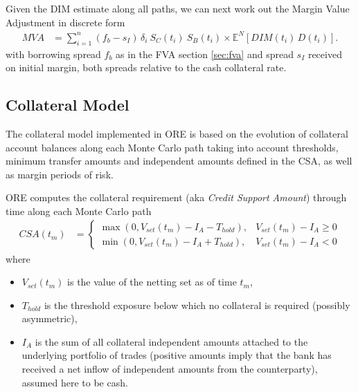 \documentclass[12pt, a4paper]{article}
\newcommand\E{\ensuremath{\mathbb{E}}}
\newcommand{\MVA}{\mathit{MVA}}
\newcommand{\DIM}{\mathit{DIM}}
\begin{document}
\begin{appendix}
\medskip
Given the DIM estimate along all paths, we can next work out the Margin Value Adjustment \cite{Lichters} in discrete form
\begin{align}
\MVA &= \sum_{i=1}^n (f_b - s_I)\, \delta_i\: S_C(t_i)\: S_B(t_i) \times \E^N\left[
\DIM(t_i)\,D(t_i)\right]. \label{MVA} 
\end{align}
with borrowing spread $f_b$ as in the FVA section \ref{sec:fva} and spread $s_I$ received on initial margin, both
spreads relative to the cash collateral rate.

\subsection{Collateral Model}\label{sec:app_collateral}

The collateral model implemented in ORE is based on the evolution of collateral account balances along each Monte Carlo
path taking into account thresholds, minimum transfer amounts and independent amounts defined in the CSA, as well as
margin periods of risk.

ORE computes the collateral requirement (aka \emph{Credit Support Amount}) through time along each Monte Carlo path
\begin{align}\label{eq:CSA}
CSA(t_m) &= 
\begin{cases}
\max(0, V_{set}(t_m) - I_A - T_{hold}),& V_{set}(t_m) - I_A \ge 0 \\
\min(0, V_{set}(t_m) - I_A + T_{hold}),& V_{set}(t_m) - I_A < 0
\end{cases}
\end{align}
where
\begin{itemize}
\item $V_{set}(t_m)$ is the value of the netting set as of
  time $t_m$,
  \item $T_{hold}$ is the threshold exposure below which no collateral is
  required (possibly asymmetric),
\item $I_A$ is the sum of all collateral independent amounts attached to
  the underlying portfolio of trades (positive amounts imply that the bank
  has received a net inflow of independent amounts from the
  counterparty), assumed here to be cash.
\end{itemize}


\end{appendix}
\end{document}
